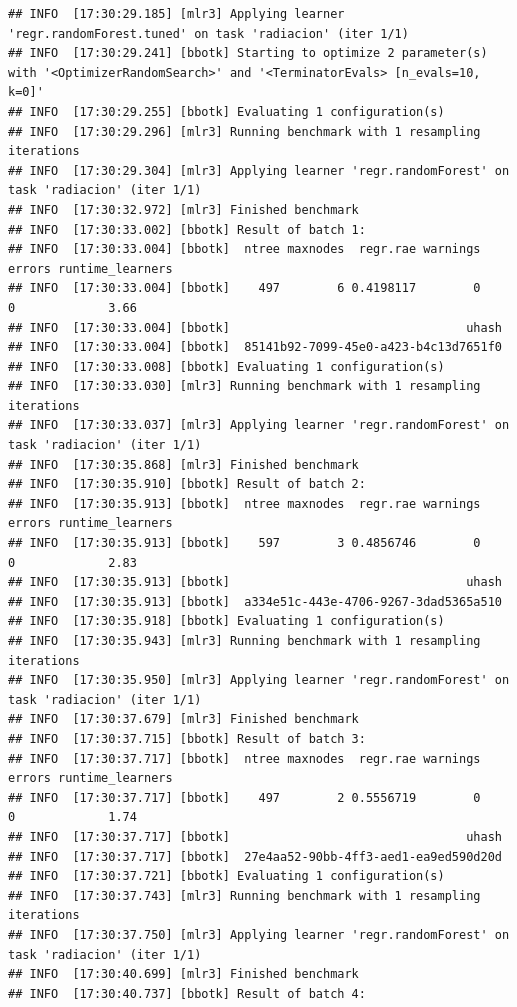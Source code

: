 \documentclass[
  11pt,
  a4paper,
]{article}
\begin{document}
\begin{verbatim}
## INFO  [17:30:29.185] [mlr3] Applying learner 'regr.randomForest.tuned' on task 'radiacion' (iter 1/1)
## INFO  [17:30:29.241] [bbotk] Starting to optimize 2 parameter(s) with '<OptimizerRandomSearch>' and '<TerminatorEvals> [n_evals=10, k=0]'
## INFO  [17:30:29.255] [bbotk] Evaluating 1 configuration(s)
## INFO  [17:30:29.296] [mlr3] Running benchmark with 1 resampling iterations
## INFO  [17:30:29.304] [mlr3] Applying learner 'regr.randomForest' on task 'radiacion' (iter 1/1)
## INFO  [17:30:32.972] [mlr3] Finished benchmark
## INFO  [17:30:33.002] [bbotk] Result of batch 1:
## INFO  [17:30:33.004] [bbotk]  ntree maxnodes  regr.rae warnings errors runtime_learners
## INFO  [17:30:33.004] [bbotk]    497        6 0.4198117        0      0             3.66
## INFO  [17:30:33.004] [bbotk]                                 uhash
## INFO  [17:30:33.004] [bbotk]  85141b92-7099-45e0-a423-b4c13d7651f0
## INFO  [17:30:33.008] [bbotk] Evaluating 1 configuration(s)
## INFO  [17:30:33.030] [mlr3] Running benchmark with 1 resampling iterations
## INFO  [17:30:33.037] [mlr3] Applying learner 'regr.randomForest' on task 'radiacion' (iter 1/1)
## INFO  [17:30:35.868] [mlr3] Finished benchmark
## INFO  [17:30:35.910] [bbotk] Result of batch 2:
## INFO  [17:30:35.913] [bbotk]  ntree maxnodes  regr.rae warnings errors runtime_learners
## INFO  [17:30:35.913] [bbotk]    597        3 0.4856746        0      0             2.83
## INFO  [17:30:35.913] [bbotk]                                 uhash
## INFO  [17:30:35.913] [bbotk]  a334e51c-443e-4706-9267-3dad5365a510
## INFO  [17:30:35.918] [bbotk] Evaluating 1 configuration(s)
## INFO  [17:30:35.943] [mlr3] Running benchmark with 1 resampling iterations
## INFO  [17:30:35.950] [mlr3] Applying learner 'regr.randomForest' on task 'radiacion' (iter 1/1)
## INFO  [17:30:37.679] [mlr3] Finished benchmark
## INFO  [17:30:37.715] [bbotk] Result of batch 3:
## INFO  [17:30:37.717] [bbotk]  ntree maxnodes  regr.rae warnings errors runtime_learners
## INFO  [17:30:37.717] [bbotk]    497        2 0.5556719        0      0             1.74
## INFO  [17:30:37.717] [bbotk]                                 uhash
## INFO  [17:30:37.717] [bbotk]  27e4aa52-90bb-4ff3-aed1-ea9ed590d20d
## INFO  [17:30:37.721] [bbotk] Evaluating 1 configuration(s)
## INFO  [17:30:37.743] [mlr3] Running benchmark with 1 resampling iterations
## INFO  [17:30:37.750] [mlr3] Applying learner 'regr.randomForest' on task 'radiacion' (iter 1/1)
## INFO  [17:30:40.699] [mlr3] Finished benchmark
## INFO  [17:30:40.737] [bbotk] Result of batch 4:

\end{verbatim}
\end{document}
